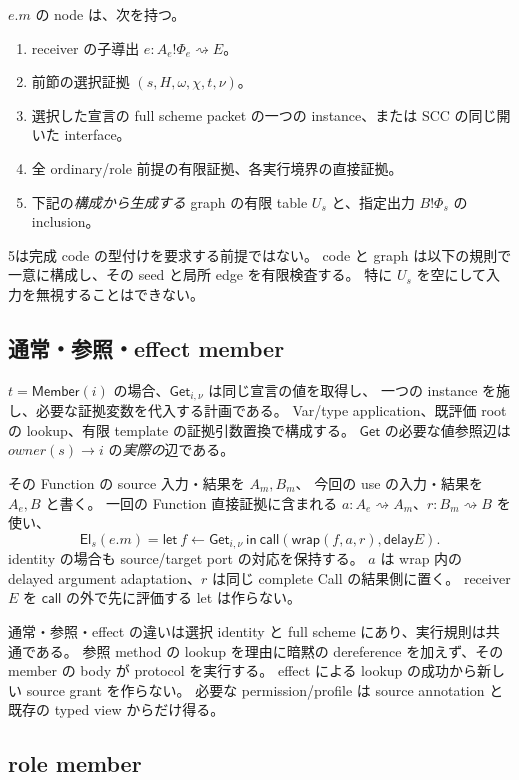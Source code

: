 \documentclass[11pt,a4paper]{article}
\newcommand{\Call}{\mathsf{call}}
\newcommand{\Delay}{\mathsf{delay}}
\newcommand{\Wrap}{\mathsf{wrap}}
\newcommand{\El}{\mathsf{El}}
\newcommand{\Dir}{\mathrel{\rightsquigarrow}}
\begin{document}
\(e.m\) の node は、次を持つ。
\begin{enumerate}
\item receiver の子導出 \(e:A_e!\Phi_e\rightsquigarrow E\)。
\item 前節の選択証拠 \((s,H,\omega,\chi,t,\nu)\)。
\item 選択した宣言の full scheme packet の一つの instance、または SCC の同じ開いた interface。
\item 全 ordinary/role 前提の有限証拠、各実行境界の直接証拠。
\item 下記の\emph{構成から生成する} graph の有限 table \(U_s\) と、指定出力 \(B!\Phi_s\) の inclusion。
\end{enumerate}
5は完成 code の型付けを要求する前提ではない。
code と graph は以下の規則で一意に構成し、その seed と局所 edge を有限検査する。
特に \(U_s\) を空にして入力を無視することはできない。

\subsection{通常・参照・effect member}

\(t=\mathsf{Member}(i)\) の場合、\(\mathsf{Get}_{i,\nu}\) は同じ宣言の値を取得し、
一つの instance を施し、必要な証拠変数を代入する計画である。
Var/type application、既評価 root の lookup、有限 template の証拠引数置換で構成する。
\(\mathsf{Get}\) の必要な値参照辺は \(owner(s)\to i\) の\emph{実際の}辺である。

その Function の source 入力・結果を \(A_m,B_m\)、
今回の use の入力・結果を \(A_e,B\) と書く。
一回の Function 直接証拠に含まれる
\(a:A_e\Dir A_m\)、\(r:B_m\Dir B\) を使い、
\[
 \El_s(e.m)=
 \mathsf{let}\ f\leftarrow\mathsf{Get}_{i,\nu}\ \mathsf{in}\
 \Call(\Wrap(f,a,r),\Delay E).
 \tag{M}
\]
identity の場合も source/target port の対応を保持する。
\(a\) は wrap 内の delayed argument adaptation、\(r\) は同じ complete Call の結果側に置く。
receiver \(E\) を \(\Call\) の外で先に評価する let は作らない。

通常・参照・effect の違いは選択 identity と full scheme にあり、実行規則は共通である。
参照 method の lookup を理由に暗黙の dereference を加えず、その member の body が protocol を実行する。
effect による lookup の成功から新しい source grant を作らない。
必要な permission/profile は source annotation と既存の typed view からだけ得る。

\subsection{role member}
\end{document}

